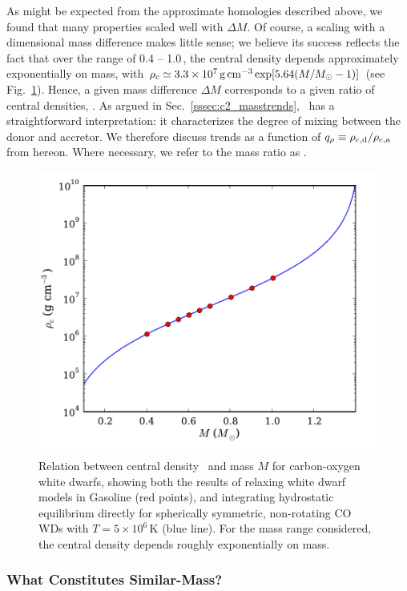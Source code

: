 As might be expected from the approximate homologies described above, we found that many properties scaled well with $\Delta M$.  Of course, a scaling with a dimensional mass difference makes little sense; we believe its success reflects the fact that over the range of 0.4 -- 1.0\,{\Msun}, the central density {\rhoc} depends approximately exponentially on mass, with $\rho_{c} \simeq 3.3\times10^7{\rm\,g\,cm^{-3}} \exp[5.64(M/\Msun-1)]$ (see Fig.~\ref{fig:c2_mrho}).  Hence, a given mass difference $\Delta M$ corresponds to a given ratio of central densities, \rhocrat.  As argued in Sec.~\ref{sssec:c2_masstrends}, \rhocrat\ has a straightforward interpretation: it characterizes the degree of mixing between the donor and accretor.  We therefore discuss trends as a function of $\qrho\equiv\rhocrat$ from hereon.  Where necessary, we refer to the mass ratio as \qm.


\begin{figure}
\centering
\includegraphics[angle=0,width=0.6\columnwidth]{chapter2_zhu+13/figures/Mrhorelation.pdf}
\caption{Relation between central density \rhoc\ and mass $M$ for carbon-oxygen white dwarfs, showing both the results of relaxing white dwarf models in Gasoline (red points), and integrating hydrostatic equilibrium directly for spherically symmetric, non-rotating CO WDs with $T=5\times 10^6\,$K (blue line).  For the mass range considered, the central density depends roughly exponentially on mass.}
\label{fig:c2_mrho}
\end{figure}

\subsubsection{What Constitutes Similar-Mass?}
\label{sssec:c2_whatisequalmass}

